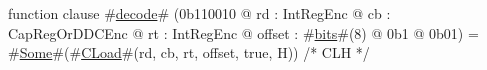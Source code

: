function clause #\hyperref[sailMIPSzdecode]{decode}# (0b110010 @ rd : IntRegEnc @ cb : CapRegOrDDCEnc @ rt : IntRegEnc @ offset : #\hyperref[sailMIPSzbits]{bits}#(8) @ 0b1 @ 0b01) = #\hyperref[sailMIPSzSome]{Some}#(#\hyperref[sailMIPSzCLoad]{CLoad}#(rd, cb, rt, offset, true,  H)) /* CLH */
